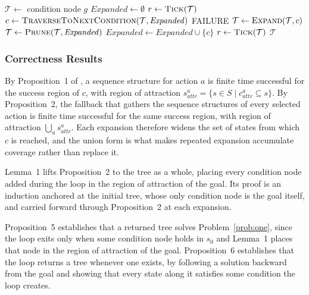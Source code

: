     \begin{algorithm}[htbp]
        \caption{BT Expansion \cite{cai2021}}
        \label{alg:bt_expansion}
        \begin{algorithmic}[1]
            \State $\mathcal{T} \gets$ condition node $g$
            \State $\mathit{Expanded} \gets \emptyset$
            \State $r \gets \textsc{Tick}(\mathcal{T})$
                \State $c \gets \textsc{TraverseToNextCondition}(\mathcal{T}, \mathit{Expanded})$
                    \State \Return FAILURE
                \EndIf
                \State $\mathcal{T} \gets \textsc{Expand}(\mathcal{T}, c)$
                \State $\mathcal{T} \gets \textsc{Prune}(\mathcal{T}, \mathit{Expanded})$
                \State $\mathit{Expanded} \gets \mathit{Expanded} \cup \{c\}$
                \State $r \gets \textsc{Tick}(\mathcal{T})$
            \EndWhile
            \State \Return $\mathcal{T}$
        \end{algorithmic}
    \end{algorithm}

    \subsubsection{Correctness Results}
    \label{subsec:inherited-correctness}
    By Proposition~1 of \cite{cai2021}, a sequence structure for action $a$ is finite time successful for the success region of $c$, with region of attraction $s^a_{attr} = \{s \in S \mid c^a_{attr} \subseteq s\}$.
    By Proposition~2, the fallback that gathers the sequence structures of every selected action is finite time successful for the same success region, with region of attraction $\bigcup_a s^a_{attr}$.
    Each expansion therefore widens the set of states from which $c$ is reached, and the union form is what makes repeated expansion accumulate coverage rather than replace it.

    Lemma~1 lifts Proposition~2 to the tree as a whole, placing every condition node added during the loop in the region of attraction of the goal.
    Its proof is an induction anchored at the initial tree, whose only condition node is the goal itself, and carried forward through Proposition~2 at each expansion.

    Proposition~5 establishes that a returned tree solves Problem~\ref{prob:one}, since the loop exits only when some condition node holds in $s_0$ and Lemma~1 places that node in the region of attraction of the goal.
    Proposition~6 establishes that the loop returns a tree whenever one exists, by following a solution backward from the goal and showing that every state along it satisfies some condition the loop creates.

